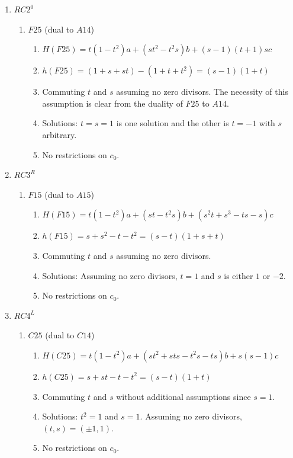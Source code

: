 \documentclass[11pt]{amsart}
\theoremstyle{definition}
\begin{document}
\begin{enumerate}
        \item[(18)] $RC2^0$
        \begin{enumerate}
            \item $F25$ (dual to $A14$)
            \begin{enumerate}
                \item $H(F25)=t(1-t^2)a + (st^2-t^2s)b+ (s-1)(t+1)sc$
                \item $h(F25)=(1+s+st)-(1+t+t^2)=(s-1)(1+t)$
                \item Commuting $t$ and $s$ assuming no zero divisors. The necessity of this assumption is clear from the duality of $F25$ to $A14$.
                \item Solutions: $t=s=1$ is one solution and the other is $t=-1$ with $s$ arbitrary.
                \item No restrictions on $c_0$.
            \end{enumerate}
        \end{enumerate}

        \item[(19)] $RC3^R$
        \begin{enumerate}
            \item $F15$ (dual to $A15$)
            \begin{enumerate}
                \item $H(F15) = t(1-t^2)a+(st-t^2s)b+(s^2t+s^3-ts-s)c$
                \item  $h(F15) = s+s^2-t-t^2=(s-t)(1+s+t)$
                \item Commuting $t$ and $s$ assuming no zero divisors. 
                \item Solutions: Assuming no zero divisors, $t=1$ and $s$ is either $1$ or $-2$. 
                \item No restrictions on $c_0$.
            \end{enumerate}
        \end{enumerate}

\item[(20)] $RC4^L$
        \begin{enumerate}
            \item $C25$ (dual to $C14$)
            \begin{enumerate}
                \item $H(C25) = t(1-t^2)a +(st^2+sts-t^2s-ts)b +s(s-1)c$
                \item  $h(C25) = s+st -t-t^2= (s-t)(1+t)$
                \item Commuting $t$ and $s$ without additional assumptions since $s=1$.
                \item Solutions: $t^2 =1$ and $s=1$. Assuming no zero divisors, $(t,s) = (\pm 1, 1)$.
                \item No restrictions on $c_0$.
            \end{enumerate}
        \end{enumerate}


\end{enumerate}
\end{document}
